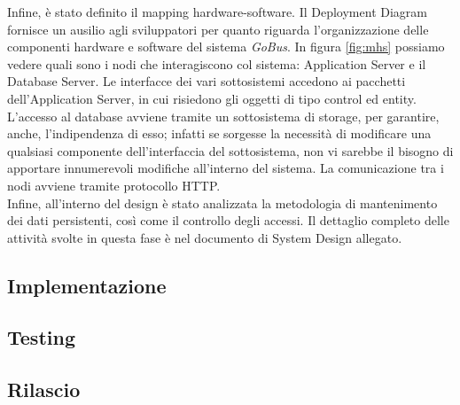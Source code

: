 Infine, \`{e} stato definito il mapping hardware-software. Il Deployment Diagram fornisce un ausilio agli sviluppatori per quanto riguarda l\rq organizzazione delle componenti hardware e software del sistema \emph{GoBus}. In figura \ref{fig:mhs} possiamo vedere quali sono i nodi che interagiscono col sistema: Application Server e il Database Server. Le interfacce dei vari sottosistemi accedono ai pacchetti dell\rq Application Server, in cui risiedono gli oggetti di tipo control ed entity. L\rq accesso al database avviene tramite un sottosistema di storage, per garantire, anche, l’indipendenza di esso; infatti se sorgesse la necessit\`{a} di modificare una qualsiasi componente dell’interfaccia del sottosistema, non vi sarebbe il bisogno di apportare innumerevoli modifiche all’interno del sistema. La comunicazione tra i nodi avviene tramite protocollo HTTP.\\
Infine, all\rq interno del design \`{e} stato analizzata la metodologia di mantenimento dei dati persistenti, cos\`{i} come il controllo degli accessi. Il dettaglio completo delle attivit\`{a} svolte in questa fase \`{e} nel documento di System Design allegato.

\subsection{Implementazione}

\subsection{Testing}

\subsection{Rilascio}